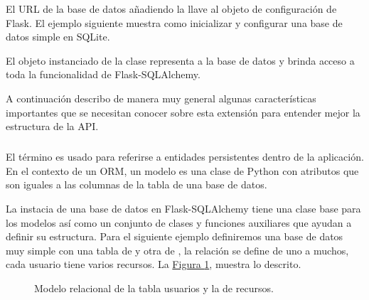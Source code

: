 El URL de la base de datos añadiendo la llave  al
objeto de configuración de Flask. El ejemplo siguiente muestra como inicializar
y configurar una base de datos simple en SQLite.

\begin{sphinxVerbatim}[commandchars=\\\{\}]
   
  
\PYG{p}{[}\PYG{p}{]} \PYGZbs{}
  
\end{sphinxVerbatim}

El objeto  instanciado de la clase  representa a la base
de datos y brinda acceso a toda la funcionalidad de Flask-SQLAlchemy.

A continuación describo de manera muy general algunas características importantes
que se necesitan conocer sobre esta extensión para entender mejor la estructura
de la API.


\subparagraph{}
\label{\detokenize{chapter_two/desc_cloudnao:definicion-de-un-modelo}}
El término  es usado para referirse a entidades persistentes dentro de la
aplicación. En el contexto de un ORM, un modelo es una clase de Python con
atributos que son iguales a las columnas de la tabla de una base de datos.

La instacia de una base de datos en Flask-SQLAlchemy tiene una clase base
para los modelos así como un conjunto de clases y funciones auxiliares que
ayudan a definir su estructura. Para el siguiente ejemplo definiremos una
base de datos muy simple con una tabla de  y otra de ,
la relación se define de uno a muchos, cada usuario tiene varios recursos.
La \hyperref[\detokenize{chapter_two/desc_cloudnao:relationship-example}]{Figura \ref{\detokenize{chapter_two/desc_cloudnao:relationship-example}}}, muestra lo descrito.

\begin{figure}[htbp]
\centering
\capstart

\noindent{}
\caption{Modelo relacional de la tabla usuarios y la de recursos.}\label{\detokenize{chapter_two/desc_cloudnao:relationship-example}}\end{figure}


